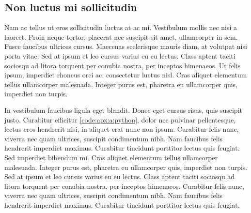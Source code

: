 \subsection{Non luctus mi sollicitudin}

Nam ac tellus ut eros sollicitudin luctus at ac mi. Vestibulum mollis nec nisi a laoreet. Proin neque tortor, placerat nec suscipit sit amet, ullamcorper in sem. Fusce faucibus ultrices cursus. Maecenas scelerisque mauris diam, at volutpat nisi porta vitae. Sed at ipsum et leo cursus varius eu eu lectus. Class aptent taciti sociosqu ad litora torquent per conubia nostra, per inceptos himenaeos. Ut felis ipsum, imperdiet rhoncus orci ac, consectetur luctus nisl. Cras aliquet elementum tellus ullamcorper malesuada. Integer purus est, pharetra eu ullamcorper quis, imperdiet non turpis.

In vestibulum faucibus ligula eget blandit. Donec eget cursus risus, quis suscipit justo. Curabitur efficitur \autoref{code:apx:a:python}, dolor nec pulvinar pellentesque, lectus eros hendrerit nisi, in aliquet erat nunc non ipsum. Curabitur felis nunc, viverra nec quam ultrices, suscipit condimentum nibh. Nam faucibus felis hendrerit imperdiet maximus. Curabitur tincidunt porttitor lectus quis feugiat. Sed imperdiet bibendum mi. Cras aliquet elementum tellus ullamcorper malesuada. Integer purus est, pharetra eu ullamcorper quis, imperdiet non turpis. Sed at ipsum et leo cursus varius eu eu lectus. Class aptent taciti sociosqu ad litora torquent per conubia nostra, per inceptos himenaeos. Curabitur felis nunc, viverra nec quam ultrices, suscipit condimentum nibh. Nam faucibus felis hendrerit imperdiet maximus. Curabitur tincidunt porttitor lectus quis feugiat. 

